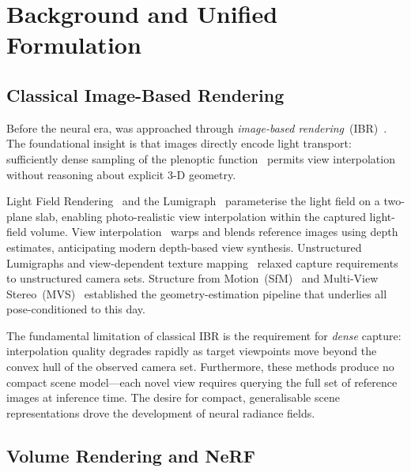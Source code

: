 \section{Background and Unified Formulation}
\label{sec:background}

\subsection{Classical Image-Based Rendering}

Before the neural era, \nvs{} was approached through
\emph{image-based rendering}~(IBR)~\citep{mcmillan1995plenoptic,chen1993view,levoy1996light}.
The foundational insight is that images directly encode light transport:
sufficiently dense sampling of the plenoptic function~\citep{adelson1991plenoptic}
permits view interpolation without reasoning about explicit 3-D geometry.

Light Field Rendering~\citep{levoy1996light} and the Lumigraph~\citep{gortler1996lumigraph}
parameterise the light field on a two-plane slab, enabling photo-realistic view
interpolation within the captured light-field volume.
View interpolation~\citep{chen1993view} warps and blends reference images
using depth estimates, anticipating modern depth-based view synthesis.
Unstructured Lumigraphs and view-dependent texture mapping~\citep{debevec1996modeling}
relaxed capture requirements to unstructured camera sets.
Structure from Motion~(SfM)~\citep{schoenberger2016sfm} and
Multi-View Stereo~(MVS)~\citep{schonberger2016mvs} established the
geometry-estimation pipeline that underlies all pose-conditioned \nvs{} to this day.

The fundamental limitation of classical IBR is the requirement for
\emph{dense} capture: interpolation quality degrades rapidly as target
viewpoints move beyond the convex hull of the observed camera set.
Furthermore, these methods produce no compact scene model---each novel view
requires querying the full set of reference images at inference time.
The desire for compact, generalisable scene representations drove the
development of neural radiance fields.

\subsection{Volume Rendering and NeRF}

